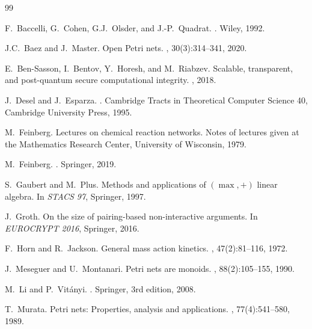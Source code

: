 \documentclass[11pt,a4paper]{article}
\begin{document}

\begin{thebibliography}{99}

F.~Baccelli, G.~Cohen, G.J.~Olsder, and J.-P.~Quadrat.
.
\newblock Wiley, 1992.

J.C.~Baez and J.~Master.
\newblock Open {P}etri nets.
, 30(3):314--341, 2020.

E.~Ben-Sasson, I.~Bentov, Y.~Horesh, and M.~Riabzev.
\newblock Scalable, transparent, and post-quantum secure computational integrity.
, 2018.

J.~Desel and J.~Esparza.
.
\newblock Cambridge Tracts in Theoretical Computer Science 40, Cambridge University Press, 1995.

M.~Feinberg.
\newblock Lectures on chemical reaction networks.
\newblock Notes of lectures given at the Mathematics Research Center, University of Wisconsin, 1979.

M.~Feinberg.
.
\newblock Springer, 2019.

S.~Gaubert and M.~Plus.
\newblock Methods and applications of $(\max, +)$ linear algebra.
\newblock In {\em STACS 97}, Springer, 1997.

J.~Groth.
\newblock On the size of pairing-based non-interactive arguments.
\newblock In {\em EUROCRYPT 2016}, Springer, 2016.

F.~Horn and R.~Jackson.
\newblock General mass action kinetics.
, 47(2):81--116, 1972.

J.~Meseguer and U.~Montanari.
\newblock Petri nets are monoids.
, 88(2):105--155, 1990.

M.~Li and P.~Vit{\'a}nyi.
.
\newblock Springer, 3rd edition, 2008.

T.~Murata.
\newblock Petri nets: Properties, analysis and applications.
, 77(4):541--580, 1989.


\end{thebibliography}
\end{document}
